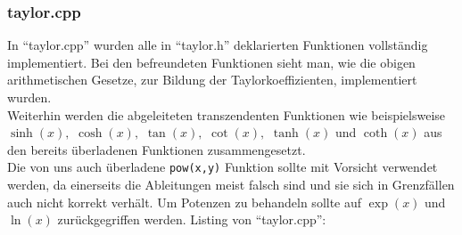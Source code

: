 \documentclass{scrartcl}
\begin{document}
\subsubsection{taylor.cpp}
In "`taylor.cpp"' wurden alle in "`taylor.h"' deklarierten Funktionen vollständig implementiert. Bei den befreundeten Funktionen sieht man, wie die obigen arithmetischen Gesetze, zur Bildung der Taylorkoeffizienten, implementiert wurden.\\
Weiterhin werden die abgeleiteten transzendenten Funktionen wie beispielsweise $\sinh(x),$ $\cosh(x),$ $\tan(x),$ $\cot(x),$ $\tanh(x)$ und $\coth(x)$ aus den bereits überladenen Funktionen zusammengesetzt.\\
Die von uns auch überladene \texttt{pow(x,y)} Funktion sollte mit Vorsicht verwendet werden, da einerseits die Ableitungen meist falsch sind und sie sich in Grenzfällen auch nicht korrekt verhält. Um Potenzen zu behandeln sollte auf $\exp(x)$ und $\ln(x)$ zurückgegriffen werden.
\newpage
\noindent Listing von "`taylor.cpp"':
\end{document}
